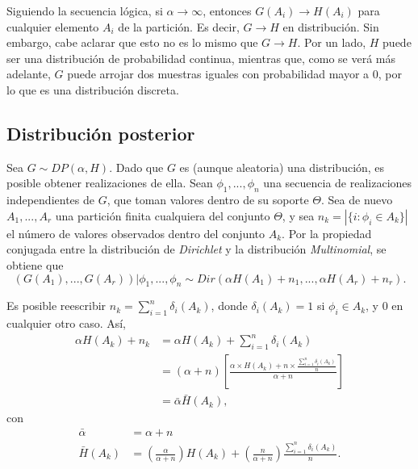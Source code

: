 Siguiendo la secuencia l\'ogica, si $\alpha \rightarrow \infty$, entonces $G(A_i) \rightarrow H(A_i)$ para cualquier elemento $A_i$ de la partici\'on. Es decir, $G \rightarrow H$ en distribuci\'on. Sin embargo, cabe aclarar que esto no es lo mismo que $G \rightarrow H$. Por un lado, $H$ puede ser una distribuci\'on de probabilidad continua, mientras que, como se ver\'a m\'as adelante, $G$ puede arrojar dos muestras iguales con probabilidad mayor a 0, por lo que es una distribuci\'on discreta.

\subsection{Distribuci\'on posterior}

Sea $G \sim DP(\alpha,H)$. Dado que $G$ es (aunque aleatoria) una distribuci\'on, es posible obtener realizaciones de ella. Sean $\phi_1,..., \phi_n$ una secuencia de realizaciones independientes de $G$, que toman valores dentro de su soporte $\Theta$. Sea de nuevo $A_1,...,A_r$ una partici\'on finita cualquiera del conjunto $\Theta$, y sea $n_k = |\{i: \phi_i \in A_k\}|$ el n\'umero de valores observados dentro del conjunto $A_k$. Por la propiedad conjugada entre la distribuci\'on de \textit{Dirichlet} y la distribuci\'on \textit{Multinomial}, se obtiene que
\begin{equation*}
   (G(A_1),...,G(A_r))|\phi_1,...,\phi_n \sim Dir(\alpha H(A_1) + n_1,...,\alpha H(A_r) + n_r). 
\end{equation*}

Es posible reescribir $n_k = \sum_{i=1}^n \delta_i(A_k)$, donde $\delta_i(A_k) = 1$ si $\phi_i \in A_k$, y $0$ en cualquier otro caso. As\'i,
\begin{equation*}
\begin{aligned}
    \alpha H(A_k) + n_k 
    &= \alpha H(A_k) + \sum_{i=1}^n \delta_i(A_k) \\
    &= (\alpha + n)
    \left[
        \frac{\alpha \times H(A_k) + n \times \frac{\sum_{i=1}^n \delta_i(A_k)}{n}}{\alpha + n}
    \right] \\
    &= \bar{\alpha} \bar{H}(A_k),
\end{aligned}
\end{equation*}
con
\begin{equation*}
\begin{aligned}
    \bar{\alpha} &= \alpha + n \\
    \bar{H}(A_k) &=  
        \left(\frac{\alpha}{\alpha + n}\right)H(A_k) + 
        \left(\frac{n}{\alpha + n}\right)\frac{\sum_{i=1}^n \delta_i(A_k)}{n}.
\end{aligned}
\end{equation*}

